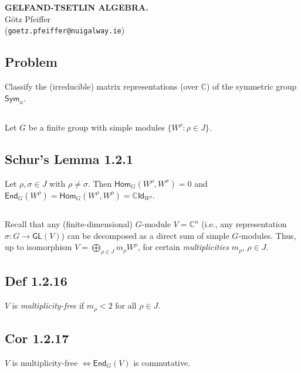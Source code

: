 \documentclass[a4paper]{amsart}
\newcommand{\C}{\mathbb{C}}
\newcommand{\Sym}{\mathsf{Sym}}
\newcommand{\GL}{\mathsf{GL}}
\newcommand{\Hom}{\mathsf{Hom}}
\newcommand{\End}{\mathsf{End}}
\newcommand{\Id}{\mathsf{Id}}
\begin{document}
\begin{center}
  \textbf{\uppercase{
Gelfand-Tsetlin Algebra.
}}\\
G\"otz Pfeiffer \\
(\texttt{goetz.pfeiffer@nuigalway.ie})
\end{center}

\subsection{Problem}
Classify the (irreducible) matrix representations (over $\C$) of the symmetric group $\Sym_n$.

\subsection{}
Let $G$ be a finite group with simple modules $\{W^{\rho}: \rho \in J\}$.

\subsection{Schur's Lemma 1.2.1}
Let  $\rho, \sigma \in J$ with $\rho \neq \sigma$.
Then
$\Hom_G(W^{\rho}, W^{\sigma}) = 0$ 
and $\End_G(W^{\rho}) = \Hom_G(W^{\rho}, W^{\rho}) = \C \Id_{W^{\rho}}$.


\subsection{}
Recall that any (finite-dimensional) $G$-module $V = \C^n$ (i.e., any representation
$\sigma \colon G \to \GL(V)$) can be decomposed as a direct
sum of simple $G$-modules.  Thus, up to isomorphism
$V = \bigoplus_{\rho \in J} m_{\rho} W^{\rho}$, for certain \emph{multiplicities}
$m_{\rho}$, $\rho \in J$.

\subsection{Def 1.2.16}
$V$ is \emph{multiplicity-free} if $m_{\rho} < 2$ for all $\rho \in J$.

\subsection{Cor 1.2.17}
$V$ is multiplicity-free $\iff \End_G(V)$ is commutative.


\subsection{}
\end{document}
